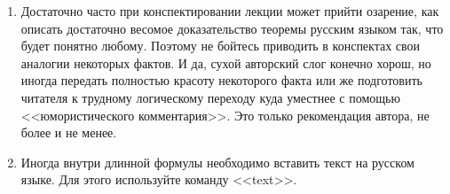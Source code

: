 \begin{enumerate}
	Если же хочется несколько строчек отдельных формул –– то про окружение <<align>> и <<aligned>>.
	\begin{table}[!ht]
		\begin{multicols}{2}
			"Матрица" формул: 
			\begin{align}
			a &=  b + c + d \\
			c + d + 4 &= e + f + g
			\end{align}
			
			\columnbreak
			
			\begin{verbatim}
			\begin{align}
			a &=  b + c + d \\
			c + d + 4 &= + e + f + g
			\end{align}
			\end{verbatim}
		\end{multicols}
		\begin{multicols}{2}
			$$
			\left\{
			\begin{aligned}
			& x+1=1\\
			& \ldots\\
			& x + N = N
			\end{aligned}
			\right.
			$$    
			
			\columnbreak
			
			\begin{verbatim}
			$$ 
			\left\{
			\begin{aligned}
			& x+1=1\\
			& \ldots\\
			& x + N = N
			\end{aligned}
			\right. 
			$$
			\end{verbatim}
		\end{multicols}
	\end{table}
	
	\item Достаточно часто при конспектировании лекции может прийти озарение, как описать достаточно весомое доказательство теоремы русским языком так, что будет понятно любому.
	Поэтому не бойтесь приводить в конспектах свои аналогии некоторых фактов. 
	И да, сухой авторский слог конечно хорош, но иногда передать полностью красоту некоторого факта или же подготовить читателя к трудному логическому переходу куда уместнее с помощью <<юмористического комментария>>. 
	Это только рекомендация автора, не более и не менее.
	
	\item Иногда внутри длинной формулы необходимо вставить текст на русском языке.
	Для этого используйте команду <<text>>.
	

\end{enumerate}
